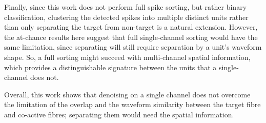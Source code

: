 \documentclass[ %
                    author={Rzan Alkabier},
                    supervisor={Dr. Zahraa Abdallah},
                    degree={MSc},
                     title={Denoising Extracellular Recording for Spike Detection and Classification on Single Channels},
                    subtitle={Does denoising improve detection and classification performance?},
                      type={},
                      year={2026}]{dissertation}
\begin{document}
\noindent
Finally, since this work does not perform full spike sorting, but rather binary classification, clustering the detected spikes into multiple distinct units rather than only separating the target from non-target is a natural extension. However, the at-chance results here suggest that full single-channel sorting would have the same limitation, since separating will still require separation by a unit's waveform shape. So, a full sorting might succeed with multi-channel spatial information, which provides a distinguishable signature between the units that a single-channel does not.
\bigskip

\noindent
Overall, this work shows that denoising on a single channel does not overcome the limitation of the overlap and the waveform similarity between the target fibre and co-active fibres; separating them would need the spatial information.  

%
%

\backmatter





\appendix
\end{document}
